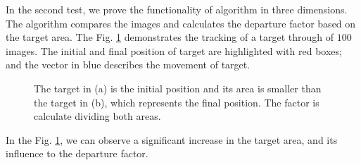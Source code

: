 In the second test, we prove the functionality of algorithm in three dimensions. 
The algorithm compares the images and calculates the departure factor 
based on the target area. The Fig. \ref{fig:target} demonstrates the 
tracking of a target through of $100$ images. The initial and final position of target are 
highlighted with red boxes; and the vector in blue describes the movement of target. 
\begin{figure}[!hbt]
\centering
  \caption{The target in (a) is the initial position and its area is smaller than the target in (b), 
  which represents the final position. The factor is calculate dividing both areas.}
  \label{fig:target}
\end{figure}
In the Fig. \ref{fig:target}, we can observe a significant increase in the target area, and 
its influence to the departure factor.

